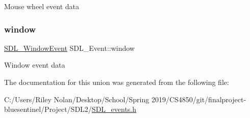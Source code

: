 Mouse wheel event data \mbox{\label{union_s_d_l___event_a826936b3275406d857bc6654669fae71}} 
\subsubsection{\texorpdfstring{window}{window}}
{\footnotesize\ttfamily \mbox{\hyperlink{struct_s_d_l___window_event}{S\+D\+L\+\_\+\+Window\+Event}} S\+D\+L\+\_\+\+Event\+::window}

Window event data 

The documentation for this union was generated from the following file\+:\begin{DoxyCompactItemize}
\item 
C\+:/\+Users/\+Riley Nolan/\+Desktop/\+School/\+Spring 2019/\+C\+S4850/git/finalproject-\/bluesentinel/\+Project/\+S\+D\+L2/\mbox{\hyperlink{_s_d_l__events_8h}{S\+D\+L\+\_\+events.\+h}}\end{DoxyCompactItemize}
